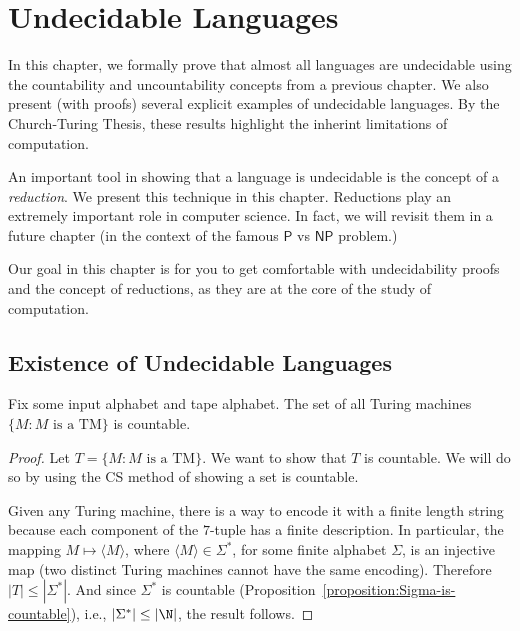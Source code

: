 

\chapter{Undecidable Languages}
\label{chapter:Undecidable-Languages}

\begin{preamble}
In this chapter, we formally prove that almost all languages are undecidable using the countability and uncountability concepts from a previous chapter. We also present (with proofs) several explicit examples of undecidable languages. By the Church-Turing Thesis, these results highlight the inherint limitations of computation.

An important tool in showing that a language is undecidable is the concept of a \emph{reduction}. We present this technique in this chapter. Reductions play an extremely important role in computer science. In fact, we will revisit them in a future chapter (in the context of the famous $\mathsf{P}$ vs $\mathsf{NP}$ problem.)

Our goal in this chapter is for you to get comfortable with undecidability proofs and the concept of reductions, as they are at the core of the study of computation.
\end{preamble}



\section{Existence of Undecidable Languages}

\begin{flex}
\begin{proposition}  \label{proposition:The-set-of-Turing-machines-is-countable}
Fix some input alphabet and tape alphabet. The set of all Turing machines $\{M : M \text{ is a TM}\}$ is countable.
\end{proposition}

\begin{proof}
Let $T = \{M : M \text{ is a TM}\}$. We want to show that $T$ is countable. We will do so by using the CS method of showing a set is countable. 

Given any Turing machine, there is a way to encode it with a finite length string because each component of the $7$-tuple has a finite description. In particular, the mapping $M \mapsto \langle M \rangle$, where $\langle M \rangle \in \Sigma^*$, for some finite alphabet $\Sigma$, is an injective map (two distinct Turing machines cannot have the same encoding). Therefore $|T| \leq |\Sigma^*|$. And since $\Sigma^*$ is countable (Proposition~\ref{proposition:Sigma-is-countable}), i.e., $|\Sigma^*| \leq |\N|$, the result follows.
\end{proof}
\end{flex}


